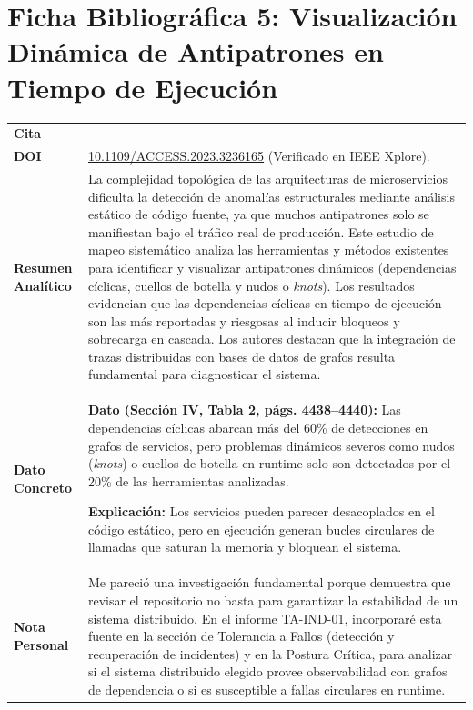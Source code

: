 \documentclass[11pt,a4paper]{article}
\begin{document}
\newpage

\section{Ficha Bibliográfica 5: Visualización Dinámica de Antipatrones en Tiempo de Ejecución}

\noindent
\renewcommand{\arraystretch}{1.2}
\begin{tabularx}{\textwidth}{|>{\raggedright\arraybackslash}p{3.2cm}|X|}
\hline
\multicolumn{2}{|c|}{\bfseries FICHA DE LECTURA N.° 5: VISUALIZACIÓN DE ANTIPATRONES} \\
\hline
\textbf{Cita} & \parbox{\dimexpr\linewidth-6pt\relax}{\raggedright\vspace{2pt}\vspace{2pt}} \\
\hline
\textbf{DOI} & \href{https://doi.org/10.1109/ACCESS.2023.3236165}{10.1109/ACCESS.2023.3236165} (Verificado en IEEE Xplore). \\
\hline
\textbf{Resumen Analítico} & La complejidad topológica de las arquitecturas de microservicios dificulta la detección de anomalías estructurales mediante análisis estático de código fuente, ya que muchos antipatrones solo se manifiestan bajo el tráfico real de producción. Este estudio de mapeo sistemático analiza las herramientas y métodos existentes para identificar y visualizar antipatrones dinámicos (dependencias cíclicas, cuellos de botella y nudos o \emph{knots}). Los resultados evidencian que las dependencias cíclicas en tiempo de ejecución son las más reportadas y riesgosas al inducir bloqueos y sobrecarga en cascada. Los autores destacan que la integración de trazas distribuidas con bases de datos de grafos resulta fundamental para diagnosticar el sistema. \\
\hline
\textbf{Dato Concreto} & \textbf{Dato (Sección IV, Tabla 2, págs. 4438--4440):} Las dependencias cíclicas abarcan más del 60\% de detecciones en grafos de servicios, pero problemas dinámicos severos como nudos (\emph{knots}) o cuellos de botella en runtime solo son detectados por el 20\% de las herramientas analizadas. \par\vspace{0.2em}
\textbf{Explicación:} Los servicios pueden parecer desacoplados en el código estático, pero en ejecución generan bucles circulares de llamadas que saturan la memoria y bloquean el sistema. \\
\hline
\textbf{Nota Personal} & Me pareció una investigación fundamental porque demuestra que revisar el repositorio no basta para garantizar la estabilidad de un sistema distribuido. En el informe TA-IND-01, incorporaré esta fuente en la sección de Tolerancia a Fallos (detección y recuperación de incidentes) y en la Postura Crítica, para analizar si el sistema distribuido elegido provee observabilidad con grafos de dependencia o si es susceptible a fallas circulares en runtime. \\
\hline
\end{tabularx}
\end{document}
